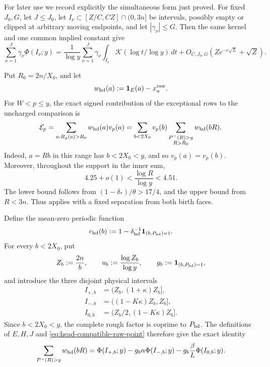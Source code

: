 \documentclass[11pt]{article}
\numberwithin{equation}{section}
\theoremstyle{definition}
\theoremstyle{remark}
\newcommand{\R}{\mathbb R}
\newcommand{\1}{\mathbf 1}
\begin{document}
For later use we record explicitly the simultaneous form just proved.
For fixed \(J_0,G\), let \(J\le J_0\), let
\(I_\nu\subset[Z/C,CZ]\cap(0,3n]\) be intervals, possibly empty or
clipped at arbitrary moving endpoints, and let \(|\gamma_\nu|\le G\).
Then the same kernel and one common implied constant give
\begin{equation}
 \sum_{\nu=1}^J\gamma_\nu\Phi(I_\nu;y)
 =\frac1{\log y}\sum_{\nu=1}^J\gamma_\nu
       \int_{I_\nu}\mathcal K(\log t/\log y)\,dt
 +O_{C,J_0,G}(Ze^{-c\sqrt L}+\sqrt Z).
 \label{eq:four-five-rough-finite-family}
\end{equation}

Put \(R_0=2n/X_0\), and let
\[
 w_{\rm hd}(a):=\1_E(a)-x_a^{\rm raw}.
\]
For \(W<p\le y\), the exact signed contribution of the exceptional rows
to the uncharged comparison is
\begin{equation}
 \mathcal E_p=
 \sum_{a:R_y(a)>R_0}w_{\rm hd}(a)v_p(a)
 =\sum_{b<2X_0}v_p(b)
    \sum_{\substack{P^-(R)>y\\R>R_0}}w_{\rm hd}(bR).
 \label{eq:exceptional-core-first}
\end{equation}
Indeed, \(a=Rb\) in this range has \(b<2X_0<y\), and so
\(v_p(a)=v_p(b)\).  Moreover, throughout the support in the inner sum,
\begin{equation}
 4.25+o(1)<\frac{\log R}{\log y}<4.51.
 \label{eq:exceptional-four-prime-range}
\end{equation}
The lower bound follows from
\((1-\delta_*)/\theta>17/4\), and the upper bound from \(R<3n\).
Thus  applies with a fixed separation
from both birth faces.

Define the mean-zero periodic function
\begin{equation}
 c_{\rm hd}(b):=1-\delta_{\rm hd}^{-1}
                       \1_{(b,P_{\rm hd})=1}.
 \label{eq:rough-periodic-core}
\end{equation}
For every \(b<2X_0\), put
\[
 Z_b:=\frac{2n}{b},\qquad
 u_b:=\frac{\log Z_b}{\log y},\qquad
 g_b:=\1_{(b,P_{\rm hd})=1},
\]
and introduce the three disjoint physical intervals
\begin{align*}
 I_{+,b}&=(Z_b,(1+\kappa)Z_b],\\
 I_{-,b}&=((1-K\kappa)Z_b,Z_b],\\
 I_{0,b}&=(Z_b/2,(1-K\kappa)Z_b].
\end{align*}
Since \(b<2X_0<y\), the complete rough factor is coprime to
\(P_{\rm hd}\).  The definitions of \(E,H,J\) and
\eqref{eq:head-compatible-raw-point} therefore give the exact identity
\begin{equation}
 \sum_{P^-(R)>y}w_{\rm hd}(bR)
 =\Phi(I_{+,b};y)-g_b\alpha\Phi(I_{-,b};y)
       -g_b\frac\beta L\Phi(I_{0,b};y).
 \label{eq:rough-three-physical-intervals}
\end{equation}
\end{document}
